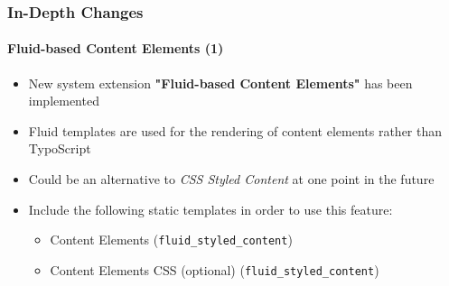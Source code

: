 %

\begin{frame}[fragile]
	\frametitle{In-Depth Changes}
	\framesubtitle{Fluid-based Content Elements (1)}

	\begin{itemize}

		\item New system extension \textbf{"Fluid-based Content Elements"} has been implemented

		\item Fluid templates are used for the rendering of content elements rather than TypoScript

		\item Could be an alternative to \textit{CSS Styled Content} at one point in the future

		\item Include the following static templates in order to use this feature:

			\begin{itemize}
				\item Content Elements (\texttt{fluid\_styled\_content})
				\item Content Elements CSS (optional) (\texttt{fluid\_styled\_content})
			\end{itemize}

	\end{itemize}

\end{frame}




